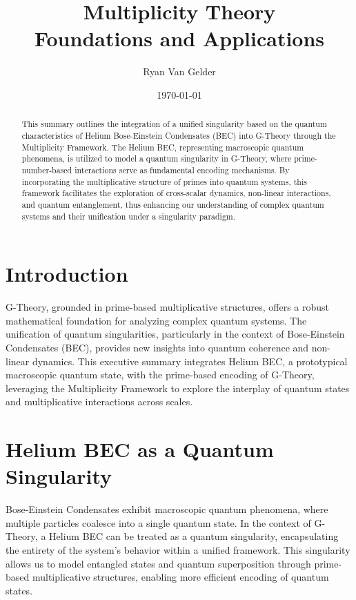 \documentclass[%
 preprint, linenumbers,
 amsmath,amssymb,
 aps, physrev,
]{revtex4-2}
\begin{document}

\title{\textbf{Multiplicity Theory \\ Foundations and Applications} 
}%


\author{Ryan Van Gelder}
%

\date{\today}%

\begin{abstract}
This summary outlines the integration of a unified singularity based on the quantum characteristics of Helium Bose-Einstein Condensates (BEC) into G-Theory through the Multiplicity Framework. The Helium BEC, representing macroscopic quantum phenomena, is utilized to model a quantum singularity in G-Theory, where prime-number-based interactions serve as fundamental encoding mechanisms. By incorporating the multiplicative structure of primes into quantum systems, this framework facilitates the exploration of cross-scalar dynamics, non-linear interactions, and quantum entanglement, thus enhancing our understanding of complex quantum systems and their unification under a singularity paradigm.
\end{abstract}

\section{Introduction}

G-Theory, grounded in prime-based multiplicative structures, offers a robust mathematical foundation for analyzing complex quantum systems. The unification of quantum singularities, particularly in the context of Bose-Einstein Condensates (BEC), provides new insights into quantum coherence and non-linear dynamics. This executive summary integrates Helium BEC, a prototypical macroscopic quantum state, with the prime-based encoding of G-Theory, leveraging the Multiplicity Framework to explore the interplay of quantum states and multiplicative interactions across scales.

\section{Helium BEC as a Quantum Singularity}

Bose-Einstein Condensates exhibit macroscopic quantum phenomena, where multiple particles coalesce into a single quantum state. In the context of G-Theory, a Helium BEC can be treated as a quantum singularity, encapsulating the entirety of the system's behavior within a unified framework. This singularity allows us to model entangled states and quantum superposition through prime-based multiplicative structures, enabling more efficient encoding of quantum states.
\end{document}
